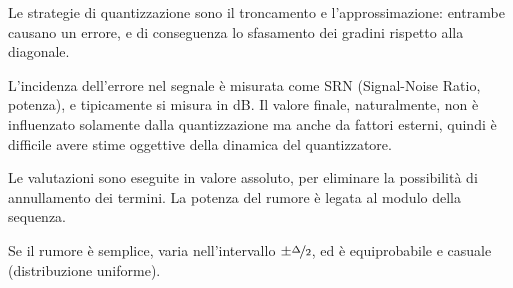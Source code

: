 Le strategie di quantizzazione sono il troncamento e l'approssimazione: entrambe causano un errore, e di conseguenza lo sfasamento dei gradini rispetto alla diagonale. 

L'incidenza dell'errore nel segnale è misurata come SRN (Signal-Noise Ratio, potenza), e tipicamente si misura in dB. Il valore finale, naturalmente, non è influenzato solamente dalla quantizzazione ma anche da fattori esterni, quindi è difficile avere stime oggettive della dinamica del quantizzatore.

Le valutazioni sono eseguite in valore assoluto, per eliminare la possibilità di annullamento dei termini. La potenza del rumore è legata al modulo della sequenza. 

Se il rumore è semplice, varia nell'intervallo $\pm \nicefrac{\Delta}{2}$, ed è equiprobabile e casuale (distribuzione uniforme). 

